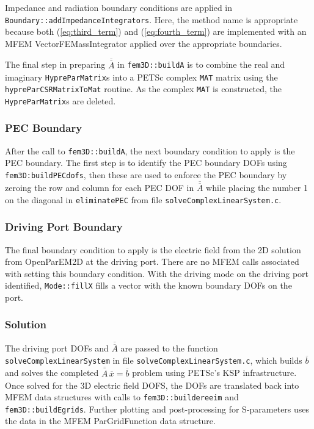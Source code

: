 \documentclass[titlepage]{article}
\renewcommand\_{\textunderscore\linebreak[1]}
\begin{document}
Impedance and radiation boundary conditions are applied in \texttt{Boundary::addImpedanceIntegrators}.  Here, the method name is appropriate because both (\ref{eq:third_term}) and (\ref{eq:fourth_term}) are implemented with an MFEM VectorFEMassIntegrator applied over the appropriate boundaries.

The final step in preparing $\overline{\overline{A}}$ in \texttt{fem3D::build\_A} is to combine the real and imaginary \texttt{HypreParMatrix}s into a PETSc complex \texttt{MAT} matrix using the \texttt{hypre\_ParCSRMatrixToMat} routine.  As the complex \texttt{MAT} is constructed, the \texttt{HypreParMatrix}s are deleted.

\subsubsection{PEC Boundary}

After the call to \texttt{fem3D::build\_A}, the next boundary condition to apply is the PEC boundary.  The first step is to identify the PEC boundary DOFs using \texttt{fem3D:build\_PEC\_dofs}, then these are used to enforce the PEC boundary by zeroing the row and column for each PEC DOF in $\overline{\overline{A}}$ while placing the number 1 on the diagonal in \texttt{eliminatePEC} from file \texttt{solveComplexLinearSystem.c}.

\subsubsection{Driving Port Boundary}

The final boundary condition to apply is the electric field from the 2D solution from OpenParEM2D at the driving port.  There are no MFEM calls associated with setting this boundary condition.  With the driving mode on the driving port identified, \texttt{Mode::fillX} fills a vector with the known boundary DOFs on the port.

\subsubsection{Solution}

The driving port DOFs and $\overline{\overline{A}}$ are passed to the function \texttt{solveComplexLinearSystem} in file \newline\texttt{solveComplexLinearSystem.c}, which builds $\overline{b}$ and solves the completed $\overline{\overline{A}}\,\overline{x}=\overline{b}$ problem using PETSc's KSP infrastructure.  Once solved for the 3D electric field DOFS, the DOFs are translated back into MFEM data structures with calls to \texttt{fem3D::build\_e\_re\_e\_im} and \texttt{fem3D::buildEgrids}.  Further plotting and post-processing for S-parameters uses the data in the MFEM ParGridFunction data structure.
\end{document}
